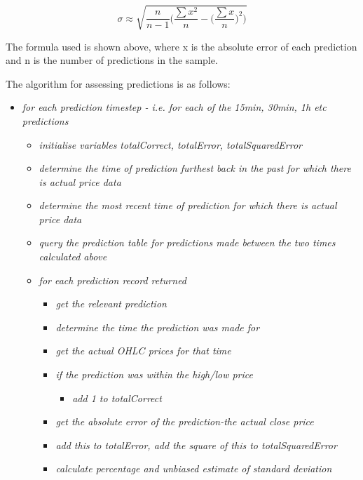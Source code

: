             \begin{equation}
            \sigma \approx \sqrt{\frac{n}{n-1} \bigg(\frac{\sum x^{2}}{n} - \big(\frac{\sum x}{n})^{2}\bigg)}
            \end{equation}

            The formula used is shown above, where x is the absolute error of each prediction and n is the number of predictions in the sample.

            \vspace{3mm}\linebreak
            The algorithm for assessing predictions is as follows: 
            \begin{itemize}
                \item \textit{for each prediction timestep - i.e. for each of the 15min, 30min, 1h etc predictions}
                    \begin{itemize}
                        \item \textit{initialise variables totalCorrect, totalError, totalSquaredError}
                        \item \textit{determine the time of prediction furthest back in the past for which there is actual price data}
                        \item \textit{determine the most recent time of prediction for which there is actual price data}
                        \item \textit{query the prediction table for predictions made between the two times calculated above}
                        \item \textit{for each prediction record returned}
                        \begin{itemize}
                            \item \textit{get the relevant prediction}
                            \item \textit{determine the time the prediction was made for}
                            \item \textit{get the actual OHLC prices for that time}
                            \item \textit{if the prediction was within the high/low price}
                            \begin{itemize}
                                \item \textit{add 1 to totalCorrect}
                            \end{itemize} 
                            \item \textit{get the absolute error of the prediction-the actual close price}
                            \item \textit{add this to totalError, add the square of this to totalSquaredError}
                            \item \textit{calculate percentage and unbiased estimate of standard deviation}
                        \end{itemize}
                    \end{itemize}
            \end{itemize}

